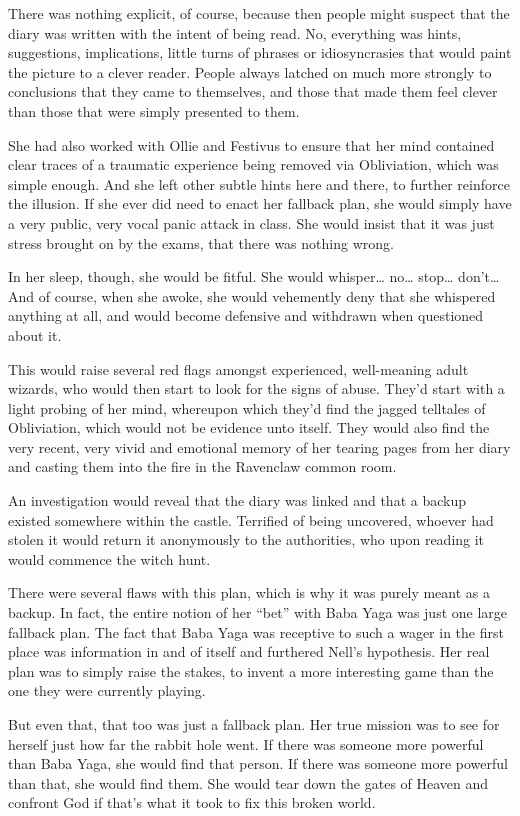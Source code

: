 There was nothing explicit, of course, because then people might suspect that the diary was written with the intent of being read. No, everything was hints, suggestions, implications, little turns of phrases or idiosyncrasies that would paint the picture to a clever reader. People always latched on much more strongly to conclusions that they came to themselves, and those that made them feel clever than those that were simply presented to them.

She had also worked with Ollie and Festivus to ensure that her mind contained clear traces of a traumatic experience being removed via Obliviation, which was simple enough. And she left other subtle hints here and there, to further reinforce the illusion. If she ever did need to enact her fallback plan, she would simply have a very public, very vocal panic attack in class. She would insist that it was just stress brought on by the exams, that there was nothing wrong.

In her sleep, though, she would be fitful. She would whisper… no… stop… don’t… And of course, when she awoke, she would vehemently deny that she whispered anything at all, and would become defensive and withdrawn when questioned about it.

This would raise several red flags amongst experienced, well-meaning adult wizards, who would then start to look for the signs of abuse. They’d start with a light probing of her mind, whereupon which they’d find the jagged telltales of Obliviation, which would not be evidence unto itself. They would also find the very recent, very vivid and emotional memory of her tearing pages from her diary and casting them into the fire in the Ravenclaw common room.

An investigation would reveal that the diary was linked and that a backup existed somewhere within the castle. Terrified of being uncovered, whoever had stolen it would return it anonymously to the authorities, who upon reading it would commence the witch hunt.

There were several flaws with this plan, which is why it was purely meant as a backup. In fact, the entire notion of her “bet” with Baba Yaga was just one large fallback plan. The fact that Baba Yaga was receptive to such a wager in the first place was information in and of itself and furthered Nell’s hypothesis. Her real plan was to simply raise the stakes, to invent a more interesting game than the one they were currently playing.

But even that, that too was just a fallback plan. Her true mission was to see for herself just how far the rabbit hole went. If there was someone more powerful than Baba Yaga, she would find that person. If there was someone more powerful than that, she would find them. She would tear down the gates of Heaven and confront God if that’s what it took to fix this broken world.

